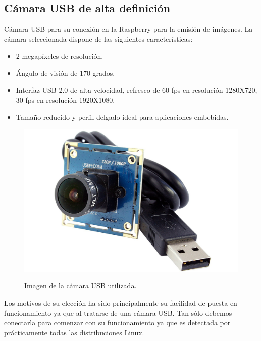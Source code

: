 \subsection{ Cámara USB de alta definición }

Cámara USB para su conexión en la Raspberry para la emisión de imágenes. La cámara seleccionada dispone de las siguientes características:

\begin{itemize}
\item 2 megapíxeles de resolución.
\item Ángulo de visión de 170 grados.
\item Interfaz USB 2.0 de alta velocidad, refresco de 60 fps en resolución 1280X720, 30 fps en resolución 1920X1080.
\item Tamaño reducido y perfil delgado ideal para aplicaciones embebidas.
\end{itemize}

\begin{figure}[H]
  \begin{center}
    \includegraphics[scale=0.15]{imagenes/robot/camara-usb.jpg}\\
    \caption{Imagen de la cámara USB utilizada.}
  \end{center}
\end{figure}

Los motivos de su elección ha sido principalmente su facilidad de puesta en funcionamiento ya que al tratarse de una cámara USB. Tan sólo debemos conectarla para comenzar con su funcionamiento ya que es detectada 
por prácticamente todas las distribuciones Linux. 
